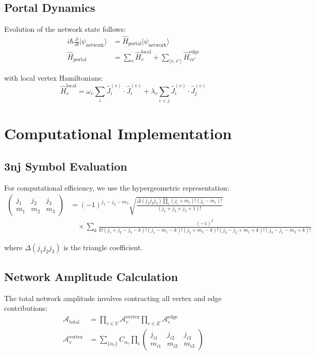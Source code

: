 \documentclass{article}
\begin{document}
\subsection{Portal Dynamics}

Evolution of the network state follows:
\begin{align}
i\hbar \frac{\partial}{\partial t} |\psi_{\text{network}}\rangle &= \hat{H}_{\text{portal}} |\psi_{\text{network}}\rangle \\
\hat{H}_{\text{portal}} &= \sum_{v} \hat{H}_v^{\text{local}} + \sum_{\langle v,v' \rangle} \hat{H}_{vv'}^{\text{edge}}
\end{align}

with local vertex Hamiltonians:
\begin{equation}
\hat{H}_v^{\text{local}} = \omega_v \sum_{i} \hat{J}_i^{(v)} \cdot \hat{J}_i^{(v)} + \lambda_v \sum_{i<j} \hat{J}_i^{(v)} \cdot \hat{J}_j^{(v)}
\end{equation}

\section{Computational Implementation}

\subsection{3nj Symbol Evaluation}

For computational efficiency, we use the hypergeometric representation:
\begin{align}
\begin{pmatrix} j_1 & j_2 & j_3 \\ m_1 & m_2 & m_3 \end{pmatrix} &= (-1)^{j_1-j_2-m_3} \sqrt{\frac{\Delta(j_1j_2j_3) \prod_i (j_i + m_i)! (j_i - m_i)!}{(j_1+j_2+j_3+1)!}} \\
&\quad \times \sum_k \frac{(-1)^k}{k!(j_1+j_2-j_3-k)!(j_1-m_1-k)!(j_2+m_2-k)!(j_3-j_2+m_1+k)!(j_3-j_1-m_2+k)!}
\end{align}

where $\Delta(j_1j_2j_3)$ is the triangle coefficient.

\subsection{Network Amplitude Calculation}

The total network amplitude involves contracting all vertex and edge contributions:
\begin{align}
\mathcal{A}_{\text{total}} &= \prod_{v \in V} \mathcal{A}_v^{\text{vertex}} \prod_{e \in E} \mathcal{A}_e^{\text{edge}} \\
\mathcal{A}_v^{\text{vertex}} &= \sum_{\{\alpha_v\}} C_{\alpha_v} \prod_{i} \begin{pmatrix} j_{i1} & j_{i2} & j_{i3} \\ m_{i1} & m_{i2} & m_{i3} \end{pmatrix}
\end{align}
\end{document}
